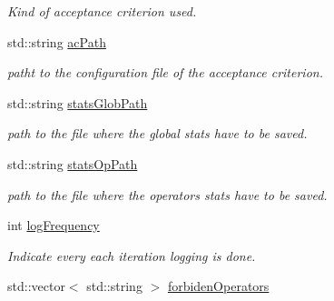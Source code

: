 \begin{DoxyCompactItemize}
\begin{DoxyCompactList}\small\item\em Kind of acceptance criterion used. \end{DoxyCompactList}\item 
\hypertarget{classALNS__Parameters_aa5ec5bd7cd255c818888969a1711605e}{std\-::string \hyperlink{classALNS__Parameters_aa5ec5bd7cd255c818888969a1711605e}{ac\-Path}}\label{classALNS__Parameters_aa5ec5bd7cd255c818888969a1711605e}

\begin{DoxyCompactList}\small\item\em patht to the configuration file of the acceptance criterion. \end{DoxyCompactList}\item 
\hypertarget{classALNS__Parameters_a040ee77338cb0393104caf1180ecb498}{std\-::string \hyperlink{classALNS__Parameters_a040ee77338cb0393104caf1180ecb498}{stats\-Glob\-Path}}\label{classALNS__Parameters_a040ee77338cb0393104caf1180ecb498}

\begin{DoxyCompactList}\small\item\em path to the file where the global stats have to be saved. \end{DoxyCompactList}\item 
\hypertarget{classALNS__Parameters_aac994b9eab5d4da5059f6b122160f0c9}{std\-::string \hyperlink{classALNS__Parameters_aac994b9eab5d4da5059f6b122160f0c9}{stats\-Op\-Path}}\label{classALNS__Parameters_aac994b9eab5d4da5059f6b122160f0c9}

\begin{DoxyCompactList}\small\item\em path to the file where the operators stats have to be saved. \end{DoxyCompactList}\item 
\hypertarget{classALNS__Parameters_ab69fe5b1f01e70f07884185cae0f7805}{int \hyperlink{classALNS__Parameters_ab69fe5b1f01e70f07884185cae0f7805}{log\-Frequency}}\label{classALNS__Parameters_ab69fe5b1f01e70f07884185cae0f7805}

\begin{DoxyCompactList}\small\item\em Indicate every each iteration logging is done. \end{DoxyCompactList}\item 
\hypertarget{classALNS__Parameters_a3b3b17ce8f5d48365c35ed2d19dcf05a}{std\-::vector$<$ std\-::string $>$ \hyperlink{classALNS__Parameters_a3b3b17ce8f5d48365c35ed2d19dcf05a}{forbiden\-Operators}}\label{classALNS__Parameters_a3b3b17ce8f5d48365c35ed2d19dcf05a}


\end{DoxyCompactItemize}
